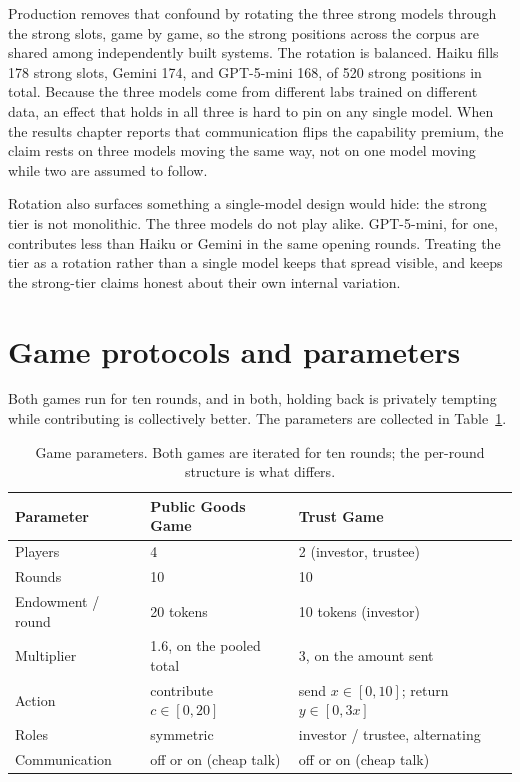 Production removes that confound by rotating the three strong models through the strong
slots, game by game, so the strong positions across the corpus are shared among
independently built systems. The rotation is balanced. Haiku fills 178 strong slots, Gemini
174, and GPT-5-mini 168, of 520 strong positions in total. Because the three models come
from different labs trained on different data, an effect that holds in all three is
hard to pin on any single model. When the results chapter reports that
communication flips the capability premium, the claim rests on three models moving the same
way, not on one model moving while two are assumed to follow.

Rotation also surfaces something a single-model design would hide: the strong tier is not
monolithic. The three models do not play alike. GPT-5-mini, for one, contributes less than
Haiku or Gemini in the same opening rounds. Treating the tier as a rotation rather than a
single model keeps that spread visible, and keeps the strong-tier claims honest about their
own internal variation.

\section{Game protocols and parameters}
\label{sec:protocols}

Both games run for ten rounds, and in both, holding back is privately tempting while
contributing is collectively better. The parameters are collected in
Table~\ref{tab:params}.

\begin{table}[t]
\centering
\caption{Game parameters. Both games are iterated for ten rounds; the per-round structure
is what differs.}
\label{tab:params}
\begin{tabular}{lll}
\toprule
Parameter & Public Goods Game & Trust Game \\
\midrule
Players & 4 & 2 (investor, trustee) \\
Rounds & 10 & 10 \\
Endowment / round & 20 tokens & 10 tokens (investor) \\
Multiplier & 1.6, on the pooled total & 3, on the amount sent \\
Action & contribute $c \in [0, 20]$ & send $x \in [0, 10]$; return $y \in [0, 3x]$ \\
Roles & symmetric & investor / trustee, alternating \\
Communication & off or on (cheap talk) & off or on (cheap talk) \\
\bottomrule
\end{tabular}
\end{table}

